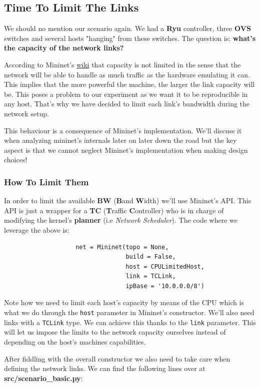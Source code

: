 \documentclass[12pt]{report}
\newcommand{\newpar} {
    \vskip 1cm
}
\begin{document}
		\subsection{Time To Limit The Links}
			We should no mention our scenario again. We had a \textbf{Ryu} controller, three \textbf{OVS} switches and several hosts "hanging" from these switches. The question is: \textbf{what's the capacity of the network links?}
			\newpar
			According to Mininet's \href{https://github.com/mininet/mininet/wiki/Introduction-to-Mininet}{wiki} that capacity is not limited in the sense that the network will be able to handle as much traffic as the hardware emulating it can. This implies that the more powerful the machine, the larger the link capacity will be. This poses a problem to our experiment as we want it to be reproducible in any host. That's why we have decided to limit each link's bandwidth during the network setup.
			\newpar
			This behaviour is a consequence of Mininet's implementation. We'll discuss it when analyzing mininet's internals later on later down the road but the key aspect is that we cannot neglect Mininet's implementation when making design choices!

			\subsubsection{How To Limit Them}
				In order to limit the available \textbf{BW} (\textbf{B}and \textbf{W}idth) we'll use Mininet's API. This API is just a wrapper for a \textbf{TC} (\textbf{T}raffic \textbf{C}ontroller) who is in charge of modifying the kernel's \textbf{planner} (i.e \textit{Network Scheduler}). The code where we leverage the above is:

				\begin{verbatim}
					net = Mininet(topo = None,
								  build = False,
								  host = CPULimitedHost,
								  link = TCLink,
								  ipBase = '10.0.0.0/8')
				\end{verbatim}

				Note how we need to limit each host's capacity by means of the CPU which is what we do through the \texttt{host} parameter in Mininet's constructor. We'll also need links with a \texttt{TCLink} type. We can achieve this thanks to the \texttt{link} parameter. This will let us impose the limits to the network capacity ourselves instead of depending on the host's machines capabilities.
				\newpar
				After fiddling with the overall constructor we also need to take care when defining the network links. We can find the following lines over at \textbf{src/scenario\_basic.py}:
\end{document}
